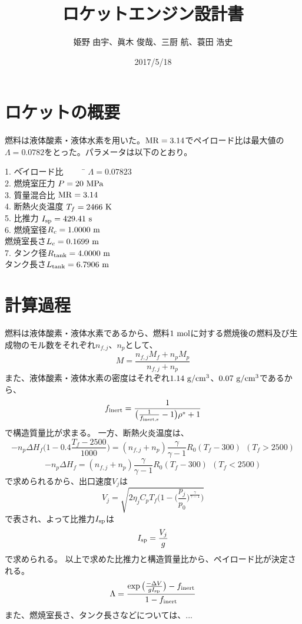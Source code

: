 \documentclass{jsarticle}
\begin{document}
\begin{titlepage}
\title{ロケットエンジン設計書}
\date{2017/5/18}
\author{姫野 由宇、眞木 俊哉、三厨 航、蓑田 浩史}
\maketitle
\thispagestyle{empty}
\end{titlepage}




\section{ロケットの概要}
燃料は液体酸素・液体水素を用いた。$\rm{MR}=3.14$でペイロード比は最大値の$\Lambda = 0.0782$をとった。パラメータは以下のとおり。

\begin{tabbing} 
1. \=ペイロード比 ~~~~ \= $\Lambda = 0.07823$\\

2. \>燃焼室圧力 \> $P = 20 ~\rm{MPa}$\\

3. \>質量混合比 \>$\rm{MR}=3.14$\\

4. \>断熱火炎温度 \>$T_f = 2466 ~ \rm{K}$\\

5. \>比推力 \>$I_{\rm{sp}}= 429.41~\rm{s}$\\

6. \>燃焼室径\>$R_c = 1.0000 ~ \rm{m}$\\

\>燃焼室長さ\>$L_c = 0.1699 ~ \rm{m}$\\

7. \>タンク径\>$R_{\rm{tank}} = 4.0000 ~ \rm{m}$\\

\>タンク長さ\>$L_{\rm{tank}} = 6.7906 ~ \rm{m}$\\
\end{tabbing} 

\section{計算過程}
燃料は液体酸素・液体水素であるから、燃料$1~\rm{mol}$に対する燃焼後の燃料及び生成物のモル数をそれぞれ$n_{f,j}$、$n_p$として、
\[
M = \frac{n_{f,j}M_f+n_pM_p}{n_{f,j}+n_p}
\]
また、液体酸素・液体水素の密度はそれぞれ$1.14 ~ \rm{g/cm^3}$、$0.07 ~ \rm{g/cm^3}$であるから、
\[
f_{\rm{inert}} = \frac{1}{\big(\frac{1}{f_{\rm{inert,s}}}-1\big)\rho^*+1}
\]
で構造質量比が求まる。
一方、断熱火炎温度は、
\[
-n_p\Delta H_f \Big( 1-0.4 \frac{T_f-2500}{1000} \Big) = (n_{f,j}+n_p)\frac{\gamma}{\gamma-1} R_0 (T_f-300) ~~ (T_f > 2500)
\]
\[
-n_p\Delta H_f = (n_{f,j}+n_p) \frac{\gamma}{\gamma-1} R_0 (T_f-300) ~~ (T_f < 2500)
\]
で求められるから、出口速度$V_j$は
\[
V_j = \sqrt{2\eta_j C_p T_f \Big( 1-\Big( \frac{p_j}{p_0}\Big)^{\frac{\gamma}{\gamma-1}} \Big)}
\]
で表され、よって比推力$I_{\rm{sp}}$は
\[
I_{\rm{sp}} = \frac{V_j}{g}
\]
で求められる。
以上で求めた比推力と構造質量比から、ペイロード比が決定される。
\[
\Lambda = \frac{\exp \big( {\frac{-\Delta V}{gI_{\rm{sp} } }}\big)-f_{\rm{inert}}}{1-f_{\rm{inert}}}
\]
また、燃焼室長さ、タンク長さなどについては、...
\end{document}
